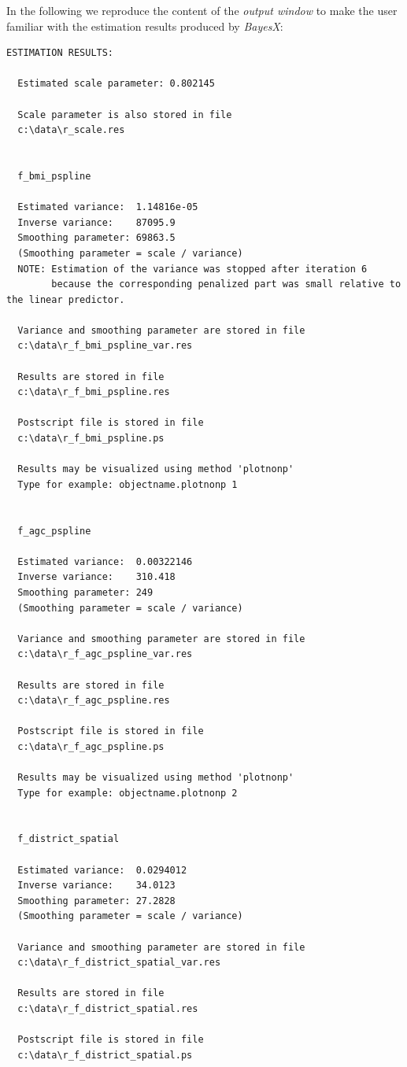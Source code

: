 In the following we reproduce the content of the {\em output
window} to make the user familiar with the estimation results
produced by {\em BayesX}:

\footnotesize
\begin{verbatim}
ESTIMATION RESULTS:

  Estimated scale parameter: 0.802145

  Scale parameter is also stored in file
  c:\data\r_scale.res


  f_bmi_pspline

  Estimated variance:  1.14816e-05
  Inverse variance:    87095.9
  Smoothing parameter: 69863.5
  (Smoothing parameter = scale / variance)
  NOTE: Estimation of the variance was stopped after iteration 6
        because the corresponding penalized part was small relative to the linear predictor.

  Variance and smoothing parameter are stored in file
  c:\data\r_f_bmi_pspline_var.res

  Results are stored in file
  c:\data\r_f_bmi_pspline.res

  Postscript file is stored in file
  c:\data\r_f_bmi_pspline.ps

  Results may be visualized using method 'plotnonp'
  Type for example: objectname.plotnonp 1


  f_agc_pspline

  Estimated variance:  0.00322146
  Inverse variance:    310.418
  Smoothing parameter: 249
  (Smoothing parameter = scale / variance)

  Variance and smoothing parameter are stored in file
  c:\data\r_f_agc_pspline_var.res

  Results are stored in file
  c:\data\r_f_agc_pspline.res

  Postscript file is stored in file
  c:\data\r_f_agc_pspline.ps

  Results may be visualized using method 'plotnonp'
  Type for example: objectname.plotnonp 2


  f_district_spatial

  Estimated variance:  0.0294012
  Inverse variance:    34.0123
  Smoothing parameter: 27.2828
  (Smoothing parameter = scale / variance)

  Variance and smoothing parameter are stored in file
  c:\data\r_f_district_spatial_var.res

  Results are stored in file
  c:\data\r_f_district_spatial.res

  Postscript file is stored in file
  c:\data\r_f_district_spatial.ps


\end{verbatim}
